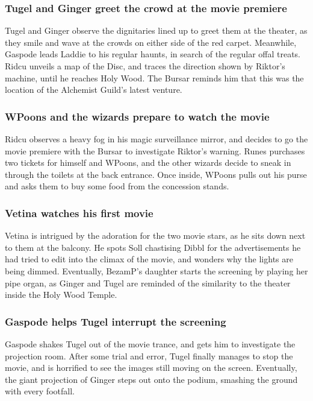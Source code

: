 \subsubsection{\Gls{Tugel} and \Gls{Ginger} greet the crowd at the movie premiere}
\Gls{Tugel} and \Gls{Ginger} observe the dignitaries lined up to greet them at the theater, as
they smile and wave at the crowds on either side of the red carpet. Meanwhile, \Gls{Gaspode} leads
\Gls{Laddie} to his regular haunts, in search of the regular offal treats. \Gls{Ridcu} unveils a
map of the Disc, and traces the direction shown by \Gls{Riktor}'s machine, until he reaches Holy
Wood. The \Gls{Bursar} reminds him that this was the location of the Alchemist Guild's latest
venture.

\subsubsection{\Gls{WPoons} and the wizards prepare to watch the movie}
\Gls{Ridcu} observes a heavy fog in his magic surveillance mirror, and decides to go the movie
premiere with the \Gls{Bursar} to investigate \Gls{Riktor}'s warning. \Gls{Runes} purchases two
tickets for himself and \Gls{WPoons}, and the other wizards decide to sneak in through the toilets
at the back entrance. Once inside, \Gls{WPoons} pulls out his purse and asks them to buy some food
from the concession stands.

\subsubsection{\Gls{Vetina} watches his first movie}
\Gls{Vetina} is intrigued by the adoration for the two movie stars, as he sits down next to them
at the balcony. He spots \Gls{Soll} chastising \Gls{Dibbl} for the advertisements he had tried to
edit into the climax of the movie, and wonders why the lights are being dimmed. Eventually,
\Gls{BezamP}'s daughter starts the screening by playing her pipe organ, as \Gls{Ginger} and
\Gls{Tugel} are reminded of the similarity to the theater inside the Holy Wood Temple.

\subsubsection{\Gls{Gaspode} helps \Gls{Tugel} interrupt the screening}
\Gls{Gaspode} shakes \Gls{Tugel} out of the movie trance, and gets him to investigate the projection
room. After some trial and error, \Gls{Tugel} finally manages to stop the movie, and is horrified
to see the images still moving on the screen. Eventually, the giant projection of \Gls{Ginger} steps
out onto the podium, smashing the ground with every footfall.

